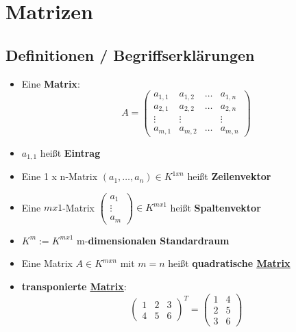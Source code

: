 \documentclass{scrartcl}
\title{\Uebung}
\author{Felix Beil \\
Maximilian Gießelmann \\
Simon Huber \\
Sebastian Kneuer \\
Mit freundlicher Unterstützung durch Simon Plazotta\\
TUM SS 2015}
\newcommand{\linkTo}[1]{\hyperref[#1]{\underline{#1}}}
\begin{document}
\pagestyle{fancy}
\lhead{}
\chead{\leftmark}
\cfoot{}
\maketitle
\label{top}
\tableofcontents

\newpage
\section{Matrizen}
\label{Matrix}
\subsection{Definitionen / Begriffserklärungen}

\begin{itemize}
\item Eine \textbf{Matrix}:
\[A = 
\begin{pmatrix} 
a_{1,1} & a_{1,2} & \dots  & a_{1,n}\\
a_{2,1} & a_{2,2} & \dots  & a_{2,n}\\
\vdots & \vdots &  &\vdots \\
a_{m,1} & a_{m,2} & \dots  & a_{m,n}
\end{pmatrix}\]

\item $a_{1,1}$ heißt \label{Eintrag} \textbf{Eintrag}

\item Eine 1 x n-Matrix $(a_{1}, \dots, a_n) \in K^{1xn} $ heißt \label{Zeilenvektor}\textbf{Zeilenvektor}

\item Eine $mx1$-Matrix $\begin{pmatrix} a_1\\ \vdots \\ a_m \end{pmatrix} \in K^{mx1} $ heißt \label{Spaltenvektor}\textbf{Spaltenvektor}

\item $K^m := K^{mx1} $ m-\label{Standardraum}\textbf{dimensionalen Standardraum}

\item Eine Matrix $A \in K^{mxn} $ mit $m=n$ heißt \label{quadratische Matrix}\textbf{quadratische \linkTo{Matrix}}

\item \label{transponierte Matrix} \textbf{transponierte \linkTo{Matrix}}: 
\[
\begin{pmatrix}
1 & 2 & 3\\
4 & 5 & 6
\end{pmatrix}^T =
\begin{pmatrix}
1 & 4 \\
2 & 5\\
3 & 6
\end{pmatrix}
\]



\end{itemize}
\end{document}
